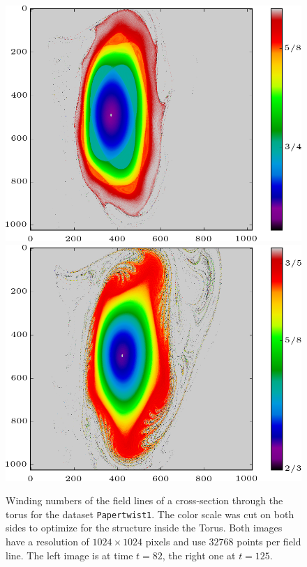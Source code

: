 \documentclass[a4paper]{article}
\begin{document}
\begin{figure}[!htb]
  \includegraphics[width=\linewidth]{Figures/Rings_Papertwist_twist1_82_steps32k.png}
\endminipage\hfill
{}
  \includegraphics[width=\linewidth]{Figures/Rings_Papertwist_twist1_125_steps32k.png}
\endminipage
	\caption{Winding numbers of the field lines of a cross-section through the torus for the dataset \texttt{Papertwist1}. The color scale was cut on both sides to optimize for the structure inside the Torus. Both images have a resolution of $1024\times 1024$ pixels and use $32768$ points per field line. The left image is at time $t=82$, the right one at $t=125$.}\label{fig:125-32k}\label{fig:82-32k}
\end{figure}
\end{document}
